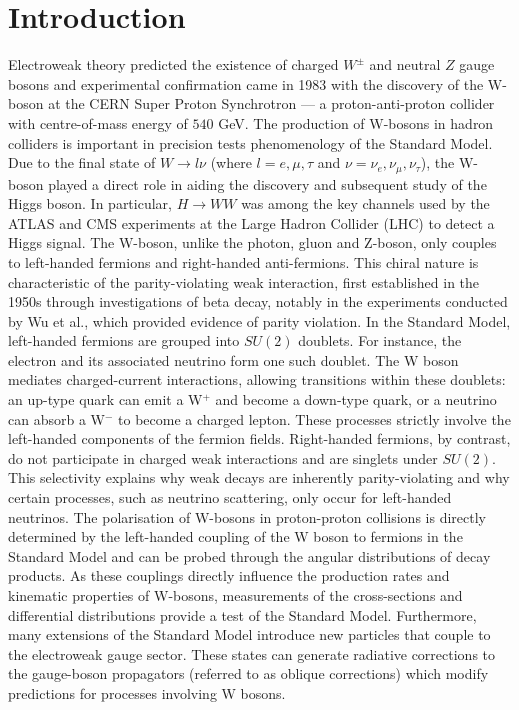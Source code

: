 \documentclass[a4paper,11pt]{article}
\begin{document}
\section{Introduction}
Electroweak theory predicted the existence of charged $W^{\pm}$ and neutral $Z$ gauge bosons and experimental confirmation came in 1983 with the discovery of the W-boson at the CERN Super Proton Synchrotron --- a proton-anti-proton collider with centre-of-mass energy of $540$ GeV\cite{UA1:1983crd}. The production of W-bosons in hadron colliders is important in precision tests phenomenology of the Standard Model. Due to the final state  of $W \rightarrow l \nu$ (where $l = e, \mu, \tau$ and  $\nu= \nu_e, \nu_\mu, \nu_\tau$), the W-boson played a direct role in aiding the discovery and subsequent study of the Higgs boson. In particular, $H \rightarrow WW$ was among the key channels used by the ATLAS and CMS experiments at the Large Hadron Collider (LHC) to detect a Higgs signal. The W-boson, unlike the photon, gluon and Z-boson, only couples to left-handed fermions and right-handed anti-fermions. This chiral nature is characteristic of the parity-violating weak interaction, first established in the 1950s through investigations of beta decay, notably in the experiments conducted by Wu et al.\cite{PhysRev.105.1413}, which provided evidence of parity violation. In the Standard Model, left-handed fermions are grouped into $SU(2)$ doublets. For instance, the electron and its associated neutrino form one such doublet. The W boson mediates charged-current interactions, allowing transitions within these doublets: an up-type quark can emit a W$^+$ and become a down-type quark, or a neutrino can absorb a W$^-$ to become a charged lepton. These processes strictly involve the left-handed components of the fermion fields. Right-handed fermions, by contrast, do not participate in charged weak interactions and are singlets under $SU(2)$. This selectivity explains why weak decays are inherently parity-violating and why certain processes, such as neutrino scattering, only occur for left-handed neutrinos. The polarisation of W-bosons in proton-proton collisions is directly determined by the left-handed coupling of the W boson to fermions in the Standard Model and can be probed through the angular distributions of decay products\cite{Stirling:2012zt}. As these couplings directly influence the production rates and kinematic properties of W-bosons, measurements of the cross-sections and differential distributions provide a test of the Standard Model. Furthermore, many extensions of the Standard Model introduce new particles that couple to the electroweak gauge sector. These states can generate radiative corrections to the gauge-boson propagators (referred to as oblique corrections) which modify predictions for processes involving W bosons\cite{Peskin:1991sw}.\\
\end{document}
